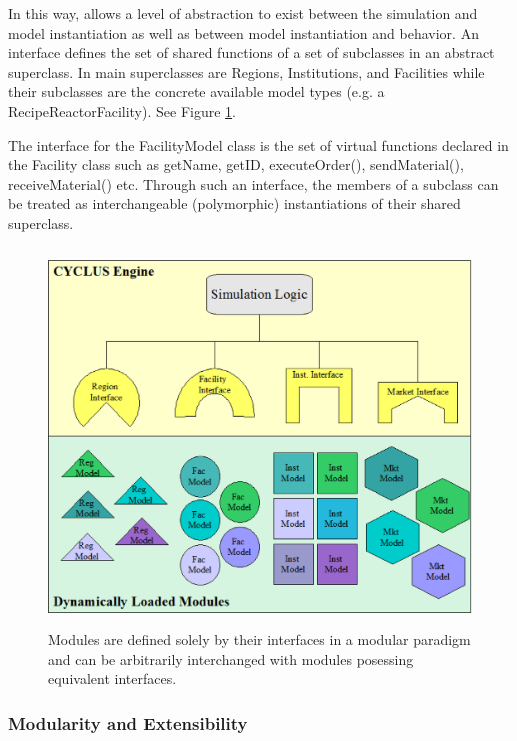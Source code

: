 In this way, \Cyclus allows a level of abstraction to exist between 
the simulation and model instantiation as well as between model 
instantiation and behavior.  An interface defines the set of shared 
functions of a set of subclasses in an abstract superclass. In \Cyclus
main superclasses are Regions, Institutions, and Facilities 
while their subclasses are the concrete available model types (e.g. a 
RecipeReactorFacility). See Figure \ref{fig:modularity}.

The interface for the FacilityModel class is the set of 
virtual functions declared in the Facility class such as getName, 
getID, executeOrder(), sendMaterial(), receiveMaterial() etc.  Through 
such an interface, the members of a subclass can be treated as 
interchangeable (polymorphic) instantiations of their shared 
superclass. 

\begin{figure}[htbp!]
  \begin{center}
    \includegraphics[height=10cm]{./chapters/paradigm/modularity.png}
  \end{center}
  \caption[Module Interfaces and Encapsulation]{Modules are defined solely 
  by their interfaces in a modular paradigm and can be arbitrarily 
  interchanged with modules posessing equivalent interfaces.}
  \label{fig:modularity}
\end{figure}


\subsubsection{Modularity and Extensibility}

